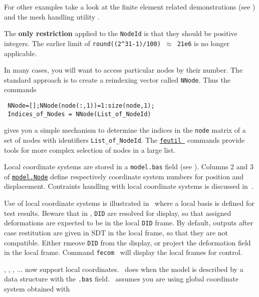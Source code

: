 For other examples take a look at the finite element related demonstrations (see ) and the mesh handling utility \femesh.

\lvs The {\bf only restriction} applied to the {\tt NodeId} is that they should be positive integers. The earlier limit of {\tt round((2\verb+^+31-1)/100) $\approx$ 21e6} is no longer applicable. 

In many cases, you will want to access particular nodes by their number. The standard approach is to create a reindexing vector called {\tt NNode}. Thus the commands

\begin{verbatim}
 NNode=[];NNode(node(:,1))=1:size(node,1);
 Indices_of_Nodes = NNode(List_of_NodeId) 
\end{verbatim}

\noindent gives you a simple mechanism to determine the indices in the {\tt node} matrix of a set of nodes with identifiers {\tt List\_of\_NodeId}. The \hyperlink{findnode}{{\tt feutil }} commands provide tools for more complex selection of nodes in a large list.


Local coordinate systems are stored in a {\tt model.bas} field (see ). Columns 2 and 3 of \hyperlink{node}{{\tt model.Node}} define respectively coordinate system numbers for position and displacement. 
Contraints handling with local coordinate systems is discussed in~.

\begin{SDT}
Use of local coordinate systems is illustrated in~ where a local basis is defined for test results.
Beware that in \feplot, {\tt DID} are resolved for display, so that assigned deformations are expected to be in the local {\tt DID} frame. By default, outputs after case restitution are given in SDT in the local frame, so that they are not compatible. Either rmeove {\tt DID} from the \feplot display, or project the deformation field in the local frame. Command {\tt fecom}~ will display the local frames for control.
\end{SDT}

\feplot, \femk, \rigid, ... now support local coordinates. \feutil\ does when the model is described by a data structure with the {\tt .bas} field. \femesh\ assumes you are using global coordinate system obtained with

